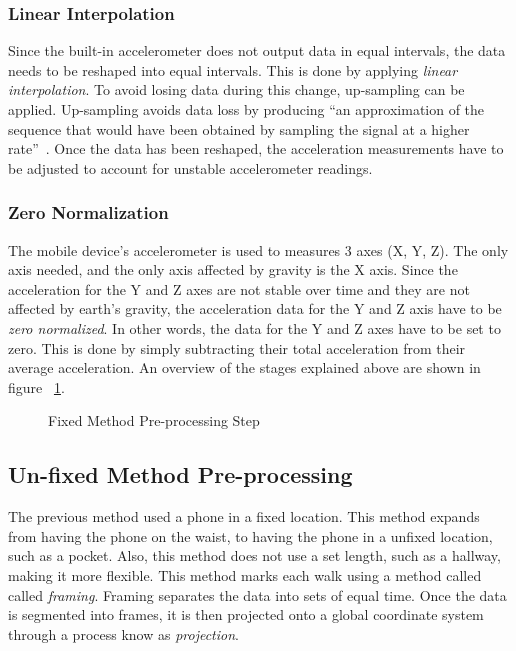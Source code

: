 \documentclass{sig-alternate}
\begin{document}
\subsubsection{Linear Interpolation} \label{LI}
	Since the built-in accelerometer does not output data in equal intervals, the data needs to be reshaped into equal intervals. This is done by applying \textit{linear interpolation}. To avoid losing data during this change, up-sampling can be applied. Up-sampling avoids data loss by producing ``an approximation of the sequence that would have been obtained by sampling the signal at a higher rate''~\cite{wiki1:2014}. Once the data has been reshaped, the acceleration measurements have to be adjusted to account for unstable accelerometer readings. 
			
\subsubsection{Zero Normalization}
	The mobile device's accelerometer is used to measures 3 axes (X, Y, Z). The only axis needed, and the only axis affected by gravity is the X axis. Since the acceleration for the Y and Z axes are not stable over time and they are not affected by earth's gravity, the acceleration data for the Y and Z axis have to be \textit{zero normalized}. In other words, the data for the Y and Z axes have to be set to zero. This is done by simply subtracting their total acceleration from their average acceleration. An overview of the stages explained above are shown in figure ~\ref{fig:firstStep}.
	
\begin{figure}
\centering
{}
\caption{Fixed Method Pre-processing Step}
\label{fig:firstStep}
\end{figure}

	
\subsection{Un-fixed Method Pre-processing}{
	The previous method used a phone in a fixed location. This method expands from having the phone on the waist, to having the phone in a unfixed location, such as a pocket. Also, this method does not use a set length, such as a hallway, making it more flexible. This method marks each walk using a method called called \textit{framing}. Framing separates the data into sets of equal time. Once the data is segmented into frames, it is then projected onto a global coordinate system through a process know as \textit{projection}.}
		
\end{document}
